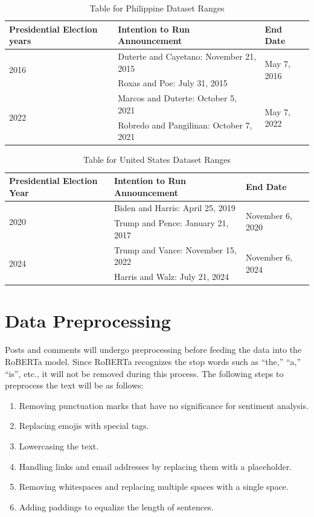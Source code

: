 \begin{table}[!h]
    \centering
    \begin{tabular}{ |m{8em}|m{10em}|m{7em}| } 
        \hline
        Presidential Election years & Intention to Run Announcement &  End Date \\
        \hline\hline
        \multirow{2}{8em}{2016} & Duterte and Cayetano: November 21, 2015 & \multirow{2}{7em}{May 7, 2016} \\
        & Roxas and Poe: July 31, 2015 & \\ 
        \hline
        \multirow{2}{8em}{2022}& Marcos and Duterte: October 5, 2021 & \multirow{2}{7em}{May 7, 2022} \\
        & Robredo and Pangilinan: October 7, 2021 & \\
        \hline
    \end{tabular}
    \caption{Table for Philippine Dataset Ranges}
\end{table}

\begin{table}[!h]
    \centering
    \begin{tabular}{ |m{8em}| m{10em}|m{7em}| } 
        \hline
        Presidential Election Year & Intention to Run Announcement & End Date \\
        \hline\hline
        \multirow{2}{8em}{2020} & Biden and Harris: April 25, 2019 & \multirow{2}{7em}{November 6, 2020} \\
        & Trump and Pence: January 21, 2017 & \\ 
        \hline
        \multirow{2}{8em}{2024}& Trump and Vance: November 15, 2022 & \multirow{2}{7em}{November 6, 2024} \\
        & Harris and Walz: July 21, 2024 & \\
        \hline
    \end{tabular}
    \caption{Table for United States Dataset Ranges}
\end{table}

\section{Data Preprocessing}
Posts and comments will undergo preprocessing before feeding the data into the RoBERTa model. Since RoBERTa recognizes the stop words such as “the,” “a,” “is”, etc., it will not be removed during this process. The following steps to preprocess the text will be as follows:

\begin{enumerate}
    \item Removing punctuation marks that have no significance for sentiment analysis.
    \item Replacing emojis with special tags.
    \item Lowercasing the text.
    \item Handling links and email addresses by replacing them with a placeholder.
    \item Removing whitespaces and replacing multiple spaces with a single space.
    \item Adding paddings to equalize the length of sentences.
\end{enumerate}

